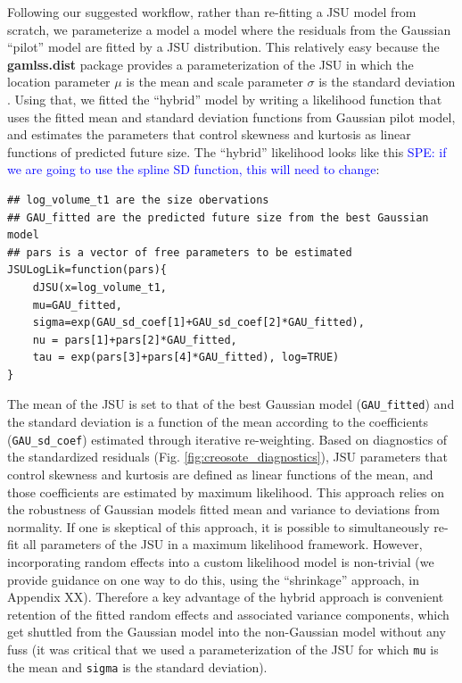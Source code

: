 \documentclass[12pt]{article}
\newcommand{\comment}{\textcolor{blue}}
\begin{document}
Following our suggested workflow, rather than re-fitting a JSU model from scratch, we parameterize a model a model where the residuals from the Gaussian ``pilot'' model are fitted by a JSU distribution. 
This relatively easy because the \textbf{gamlss.dist} package provides a parameterization of the JSU in which 
the location parameter $\mu$ is the mean and scale parameter $\sigma$ is the standard deviation \citep{rigby2019distributions}. 
Using that, we fitted the ``hybrid'' model by writing a likelihood function that uses the fitted mean and standard deviation functions from Gaussian pilot model, and estimates the parameters that control skewness and kurtosis
as linear functions of predicted future size.   
The ``hybrid'' likelihood looks like this \comment{SPE: if we are going to use the spline SD function, this will need to change}:
\begin{lstlisting}
## log_volume_t1 are the size obervations
## GAU_fitted are the predicted future size from the best Gaussian model
## pars is a vector of free parameters to be estimated
JSULogLik=function(pars){
	dJSU(x=log_volume_t1, 
	mu=GAU_fitted,
	sigma=exp(GAU_sd_coef[1]+GAU_sd_coef[2]*GAU_fitted),
	nu = pars[1]+pars[2]*GAU_fitted,
	tau = exp(pars[3]+pars[4]*GAU_fitted), log=TRUE)
}
\end{lstlisting}
The mean of the JSU is set to that of the best Gaussian model (\verb|GAU_fitted|) and the standard deviation is a function of the mean according to the coefficients (\verb|GAU_sd_coef|) estimated through iterative re-weighting. 
Based on diagnostics of the standardized residuals (Fig. \ref{fig:creosote_diagnostics}), JSU parameters that control skewness and kurtosis are defined as linear functions of the mean, and those coefficients are estimated by maximum likelihood. 
This approach relies on the robustness of Gaussian models fitted mean and variance to deviations from normality. 
If one is skeptical of this approach, it is possible to simultaneously re-fit all parameters of the JSU in a maximum likelihood framework. 
However, incorporating random effects into a custom likelihood model is non-trivial (we provide guidance on one way to do this, using the ``shrinkage'' approach, in Appendix XX). 
Therefore a key advantage of the hybrid approach is convenient retention of the fitted random effects and associated variance components, which get shuttled from the Gaussian model into the non-Gaussian model without any fuss (it was critical that we used a parameterization of the JSU for which \verb|mu| is the mean and \verb|sigma| is the standard deviation). 
\end{document}
